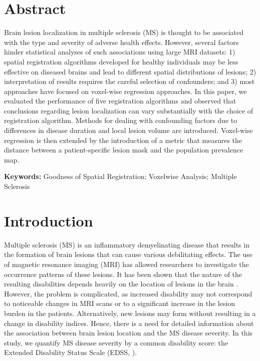 \documentclass[10pt]{article}
\begin{document}
\section*{Abstract}

Brain lesion localization in multiple sclerosis (MS) is thought to be associated with the type and severity of adverse health effects. However, several factors hinder statistical analyses of such associations using large MRI datasets: 1) spatial registration algorithms  developed for healthy individuals may be less effective on diseased brains and lead to different spatial distributions of lesions; 2) interpretation of results requires the careful selection of confounders; and 3) most approaches have focused on voxel-wise regression approaches. In this paper, we evaluated the performance of five registration algorithms and observed that conclusions regarding lesion localization can vary substantially with the choice of registration algorithm. Methods for dealing with confounding factors due to differences in disease duration and local lesion volume are introduced. Voxel-wise regression is then extended by the introduction of a metric that measures the distance between a patient-specific lesion mask and the population prevalence map.

{\bf Keywords:} Goodness of Spatial Registration; Voxelwise Analysis; Multiple Sclerosis


\section*{Introduction}

Multiple sclerosis (MS) is an inflammatory demyelinating disease that results in the  formation of brain lesions that can cause various debilitating effects. The use of magnetic
resonance imaging (MRI) has allowed researchers to investigate the
occurrence patterns of these lesions. It has been shown that the
nature of the resulting disabilities depends heavily on the location
of lesions in the brain \cite{bodini2011t2}. However, the problem is
complicated, as increased disability may not correspond to 
noticeable changes in MRI scans or to a significant increase in the lesion burden in the patients. Alternatively, new lesions may form without resulting in a change in disability indices. Hence, there is a need for detailed information about the association between brain lesion location and the MS disease severity. In this study, we quantify MS disease severity by a common disability score: the Extended Disability Status Scale (EDSS, \cite{kurtzke1983rating}).
\end{document}
